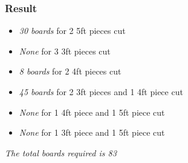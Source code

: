 \documentclass[]{article}
\providecommand{\tightlist}{%
  \setlength{\itemsep}{0pt}\setlength{\parskip}{0pt}}
\begin{document}
\pagebreak

\subsubsection{Result}\label{result-1}

\begin{itemize}
\tightlist
\item
  \emph{30 boards} for 2 5ft pieces cut
\item
  \emph{None} for 3 3ft pieces cut
\item
  \emph{8 boards} for 2 4ft pieces cut
\item
  \emph{45 boards} for 2 3ft pieces and 1 4ft piece cut
\item
  \emph{None} for 1 4ft piece and 1 5ft piece cut
\item
  \emph{None} for 1 3ft piece and 1 5ft piece cut
\end{itemize}

\emph{The total boards required is 83}
\end{document}
